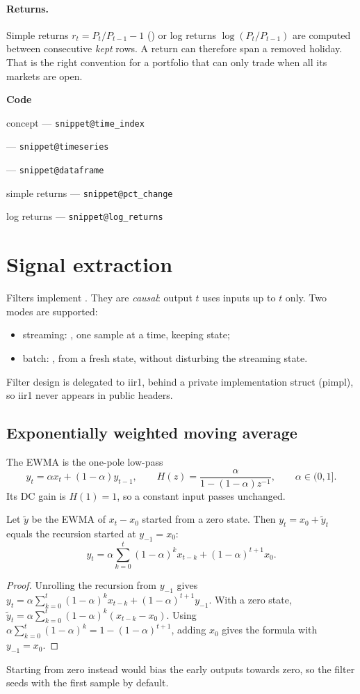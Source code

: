 \documentclass[11pt,a4paper]{article}
\makeatletter
\newcommand{\snippetsource}[1]{\csname snippet@#1\endcsname}
\newcommand{\snippet}[3]{%
  }
\newenvironment{codepointers}{%
  \par\smallskip\begingroup\footnotesize\noindent\textcolor{blue!50!black}{\textbf{Code}}\par\nopagebreak
  \begin{list}{}{\setlength{\leftmargin}{1.2em}\setlength{\itemsep}{0pt}\setlength{\parsep}{0pt}\setlength{\topsep}{1pt}}}%
  {\end{list}\endgroup\smallskip}
\newcommand{\codeitem}[2]{\item #2 --- \texttt{\snippetsource{#1}}}
\makeatother
\begin{document}
\paragraph{Returns.} Simple returns $r_t=P_t/P_{t-1}-1$ () or log returns
$\log(P_t/P_{t-1})$ are computed between consecutive \emph{kept} rows. A return can
therefore span a removed holiday. That is the right convention for a portfolio that can
only trade when all its markets are open.

\snippet{df_drop_missing}{C++}{Alignment: keep rows where every column is finite}
\begin{codepointers}
  \codeitem{time_index}{ concept}
  \codeitem{timeseries}{}
  \codeitem{dataframe}{}
  \codeitem{pct_change}{simple returns}
  \codeitem{log_returns}{log returns}
\end{codepointers}

\section{Signal extraction}\label{sec:signal}

Filters implement . They are \emph{causal}: output $t$ uses inputs up to
$t$ only. Two modes are supported:
\begin{itemize}
  \item streaming: , one sample at a time, keeping state;
  \item batch: , from a fresh state, without disturbing the streaming
        state.
\end{itemize}
Filter design is delegated to iir1, behind a private implementation struct (pimpl), so iir1
never appears in public headers.

\subsection{Exponentially weighted moving average}
The EWMA is the one-pole low-pass
\[
  y_t=\alpha x_t+(1-\alpha)y_{t-1},\qquad H(z)=\frac{\alpha}{1-(1-\alpha)z^{-1}},\qquad \alpha\in(0,1].
\]
Its DC gain is $H(1)=1$, so a constant input passes unchanged.

\begin{proposition}[Seeding]
Let $\tilde y$ be the EWMA of $x_t-x_0$ started from a zero state. Then $y_t=x_0+\tilde y_t$
equals the recursion started at $y_{-1}=x_0$:
\[
  y_t=\alpha\sum_{k=0}^{t}(1-\alpha)^k x_{t-k}+(1-\alpha)^{t+1}x_0 .
\]
\end{proposition}
\begin{proof}
Unrolling the recursion from $y_{-1}$ gives
$y_t=\alpha\sum_{k=0}^{t}(1-\alpha)^kx_{t-k}+(1-\alpha)^{t+1}y_{-1}$. With a zero state,
$\tilde y_t=\alpha\sum_{k=0}^t(1-\alpha)^k(x_{t-k}-x_0)$. Using
$\alpha\sum_{k=0}^t(1-\alpha)^k=1-(1-\alpha)^{t+1}$, adding $x_0$ gives the formula with
$y_{-1}=x_0$.
\end{proof}
Starting from zero instead would bias the early outputs towards zero, so the filter seeds
with the first sample by default.
\end{document}
